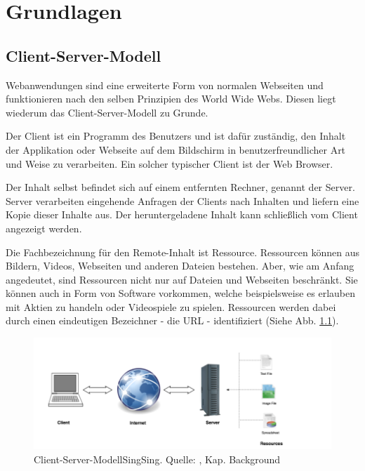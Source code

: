 \chapter{Grundlagen}

\section{Client-Server-Modell}
\label{sec:client_server}

Webanwendungen sind eine erweiterte Form von normalen Webseiten und funktionieren nach den selben Prinzipien des World Wide Webs. Diesen liegt wiederum das Client-Server-Modell zu Grunde.

Der Client ist ein Programm des Benutzers und ist dafür zuständig, den Inhalt der Applikation oder Webseite auf dem Bildschirm in benutzerfreundlicher Art und Weise zu verarbeiten. Ein solcher typischer Client ist der Web Browser.

Der Inhalt selbst befindet sich auf einem entfernten Rechner, genannt der Server. Server verarbeiten eingehende Anfragen der Clients nach Inhalten und liefern eine Kopie dieser Inhalte aus. Der heruntergeladene Inhalt kann schließlich vom Client angezeigt werden.

Die Fachbezeichnung für den Remote-Inhalt ist Ressource. Ressourcen können aus Bildern, Videos, Webseiten und anderen Dateien bestehen. Aber, wie am Anfang angedeutet, sind Ressourcen nicht nur auf Dateien und Webseiten beschränkt. Sie können auch in Form von Software vorkommen, welche beispielsweise es erlauben mit Aktien zu handeln oder Videospiele zu spielen. Ressourcen werden dabei durch einen eindeutigen Bezeichner - die URL - identifiziert (Siehe Abb. \ref{fig:client_server}).

\begin{figure}[htp]     %
\centering
\includegraphics[width=1.0\textwidth]{images/client_server}
\caption{Client-Server-ModellSingSing. Quelle: \cite{Parikh:2015}, Kap. Background}\label{fig:client_server}
\end{figure}

